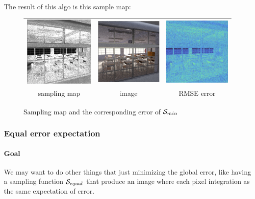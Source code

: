 \documentclass{classeENS}
\begin{document}
The result of this algo is this sample map:
\begin{figure}[H]
    \centering
    \caption{Sampling map and the corresponding error of $\mathcal S_{min}$}
    \begin{tabular}{ccc}
    \includegraphics[width=45mm]{image/without/sm_min.png}
    & \includegraphics[width=45mm]{image/without/normal_min.png}
    & \includegraphics[width=45mm]{image/without/RMSE_min.png} \\
    sampling map & image & RMSE error
    \end{tabular}
\end{figure}

\subsubsection{Equal error expectation}

\paragraph*{Goal} We may want to do other things that just minimizing the global error, 
like having a sampling function $\mathcal S_{equal}$ 
that produce an image where each pixel integration as the same expectation of error. 
\end{document}
